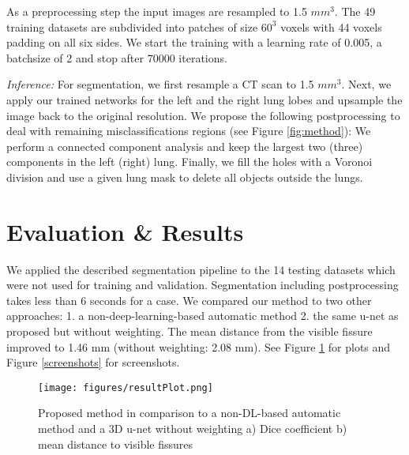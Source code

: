 \documentclass{midl} %
\begin{document}
As a preprocessing step the input images are resampled to 1.5 $mm^3$.
The 49 training datasets are subdivided into patches of size $60^3$ voxels with 44 voxels padding on all six sides. We start the training with a learning rate of 0.005, a batchsize of 2 and stop after 70000 iterations.

\emph{Inference:} For segmentation, we first resample a CT scan to 1.5 $mm^3$. Next, we apply our trained networks for the left and the right lung lobes and upsample the image back to the original resolution.
We propose the following postprocessing to deal with remaining misclassifications regions (see Figure \ref{fig:method}): We perform a connected component analysis and keep the largest two (three) components in the left (right) lung. Finally, we fill the holes with a Voronoi division and use a given lung mask to delete all objects outside the lungs. 

\section{Evaluation \& Results}
We applied the described segmentation pipeline to the 14 testing datasets which were not used for training and validation. Segmentation including postprocessing takes less than 6 seconds for a case. We compared our method to two other approaches: 1. a non-deep-learning-based automatic method \cite{lassen2013} 2. the same u-net as proposed but without weighting. The mean distance from the visible fissure improved to 1.46 mm (without weighting: 2.08 mm). See Figure \ref{fig:boxplots} for plots and Figure \ref{screenshots} for screenshots. 

\begin{figure}[htbp]
    \centering
    \texttt{[image: figures/resultPlot.png]}
    \caption{\label{fig:boxplots}
Proposed method in comparison to a non-DL-based automatic method and a 3D u-net without weighting a) Dice coefficient b) mean distance to visible fissures}
\end{figure}
\vspace{-3mm}

\end{document}
